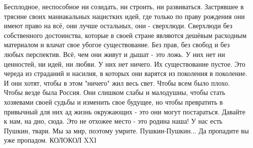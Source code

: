 Бесплодное, неспособное ни созидать, ни строить, ни развиваться. Застрявшее в трясине своих маниакальных нацистких идей, где только по праву рождения они имеют право на всё, они лучше остальных, они - сверхлюди.
Сверхлюди без собственного достоинства, которые в своей стране являются дешёвым расходным материалом и влачат свое убогое существование. Без прав, без свобод и без любых перспектив.
Всё, чем они живут и дышат - это ложь.
У них нет ни ценностей, ни идей, ни любви.
У них нет ничего. Их существование пустое. Это череда из страданий и насилия, в которых они варятся из поколения в поколение. И они хотят, чтобы в этом "ничего" жил весь свет. Чтобы всем было плохо. Чтобы везде была Россия. Они слишком слабы и малодушны, чтобы стать хозяевами своей судьбы и изменить свое будущее, но чтобы превратить в привычный для них ад жизнь окружающих - это они могут постараться. Давайте к нам, на дно, сюда. Это не отхожее место - это родина наша!
У нас есть Пушкин, твари.
Мы за мир, поэтому умрите.
Пушкин-Пушкин...
Да пропадите вы уже пропадом.
КОЛОКОЛ XXI
